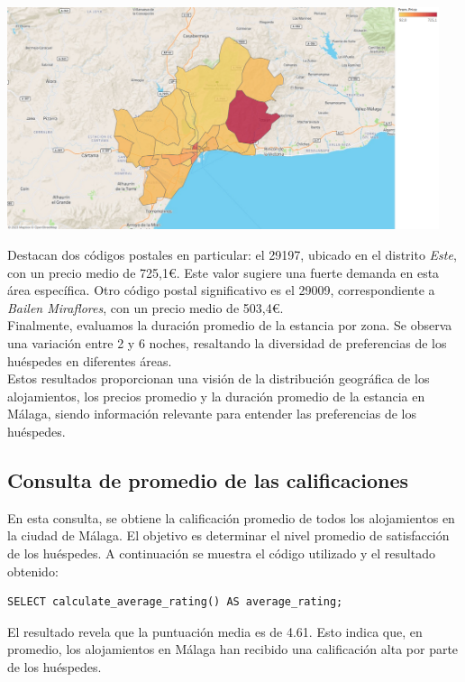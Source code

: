 \begin{center}
    \centering
    \includegraphics[width=0.95\textwidth]{capturas/10.png}
\end{center}
Destacan dos códigos postales en particular: el 29197, ubicado en el distrito \textit{Este}, con un precio medio de 725,1€. Este valor sugiere una fuerte demanda en esta área específica. Otro código postal significativo es el 29009, correspondiente a \textit{Bailen Miraflores}, con un precio medio de 503,4€.\\
Finalmente, evaluamos la duración promedio de la estancia por zona. Se observa una variación entre 2 y 6 noches, resaltando la diversidad de preferencias de los huéspedes en diferentes áreas.\\
Estos resultados proporcionan una visión de la distribución geográfica de los alojamientos, los precios promedio y la duración promedio de la estancia en Málaga, siendo información relevante para entender las preferencias de los huéspedes.

\subsection{Consulta de promedio de las calificaciones}
En esta consulta, se obtiene la calificación promedio de todos los alojamientos en la ciudad de Málaga. El objetivo es determinar el nivel promedio de satisfacción de los huéspedes. A continuación se muestra el código utilizado y el resultado obtenido:
\begin{verbatim}
SELECT calculate_average_rating() AS average_rating;
\end{verbatim}

El resultado revela que la puntuación media es de 4.61. Esto indica que, en promedio, los alojamientos en Málaga han recibido una calificación alta por parte de los huéspedes.

